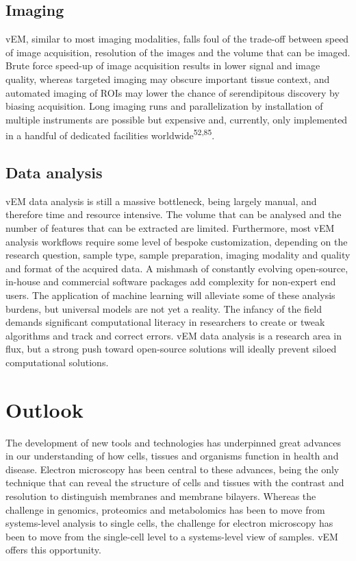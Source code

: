 \documentclass{article}
\begin{document}
\subsection*{Imaging}

vEM, similar to most imaging modalities, falls foul of the trade-off between speed of image acquisition, resolution of the images and the volume that can be imaged. Brute force speed-up of image acquisition results in lower signal and image quality, whereas targeted imaging may obscure important tissue context, and automated imaging of ROIs may lower the chance of serendipitous discovery by biasing acquisition. Long imaging runs and parallelization by installation of multiple instruments are possible but expensive and, currently, only implemented in a handful of dedicated facilities worldwide\textsuperscript{52,85}.

\subsection*{Data analysis}

vEM data analysis is still a massive bottleneck, being largely manual, and therefore time and resource intensive. The volume that can be analysed and the number of features that can be extracted are limited. Furthermore, most vEM analysis workflows require some level of bespoke customization, depending on the research question, sample type, sample preparation, imaging modality and quality and format of the acquired data. A mishmash of constantly evolving open-source, in-house and commercial software packages add complexity for non-expert end users. The application of machine learning will alleviate some of these analysis burdens, but universal models are not yet a reality. The infancy of the field demands significant computational literacy in researchers to create or tweak algorithms and track and correct errors. vEM data analysis is a research area in flux, but a strong push toward open-source solutions will ideally prevent siloed computational solutions.

\section*{Outlook}

The development of new tools and technologies has underpinned great advances in our understanding of how cells, tissues and organisms function in health and disease. Electron microscopy has been central to these advances, being the only technique that can reveal the structure of cells and tissues with the contrast and resolution to distinguish membranes and membrane bilayers. Whereas the challenge in genomics, proteomics and metabolomics has been to move from systems-level analysis to single cells, the challenge for electron microscopy has been to move from the single-cell level to a systems-level view of samples. vEM offers this opportunity.
\end{document}
